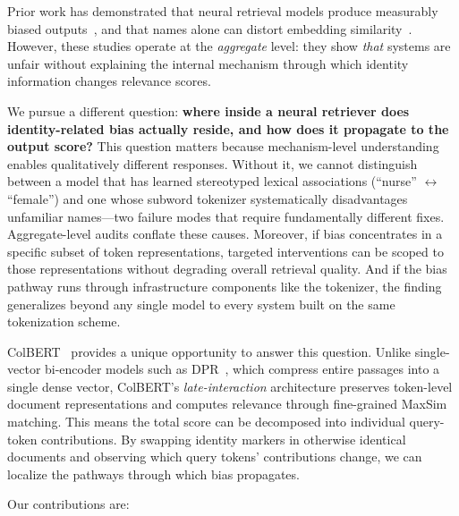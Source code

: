 \documentclass[sigconf,review,anonymous]{acmart}
\begin{document}
Prior work has demonstrated that neural retrieval models produce measurably biased outputs~\cite{rekabsaz2021, ziems2024}, and that names alone can distort embedding similarity~\cite{manchanda2025}. However, these studies operate at the \emph{aggregate} level: they show \emph{that} systems are unfair without explaining the internal mechanism through which identity information changes relevance scores.

We pursue a different question: \textbf{where inside a neural retriever does identity-related bias actually reside, and how does it propagate to the output score?} This question matters because mechanism-level understanding enables qualitatively different responses. Without it, we cannot distinguish between a model that has learned stereotyped lexical associations (``nurse'' $\leftrightarrow$ ``female'') and one whose subword tokenizer systematically disadvantages unfamiliar names---two failure modes that require fundamentally different fixes. Aggregate-level audits conflate these causes. Moreover, if bias concentrates in a specific subset of token representations, targeted interventions can be scoped to those representations without degrading overall retrieval quality. And if the bias pathway runs through infrastructure components like the tokenizer, the finding generalizes beyond any single model to every system built on the same tokenization scheme.

ColBERT~\cite{khattab2020, santhanam2022} provides a unique opportunity to answer this question. Unlike single-vector bi-encoder models such as DPR~\cite{karpukhin2020}, which compress entire passages into a single dense vector, ColBERT's \emph{late-interaction} architecture preserves token-level document representations and computes relevance through fine-grained MaxSim matching. This means the total score can be decomposed into individual query-token contributions. By swapping identity markers in otherwise identical documents and observing which query tokens' contributions change, we can localize the pathways through which bias propagates.

Our contributions are:
\end{document}
